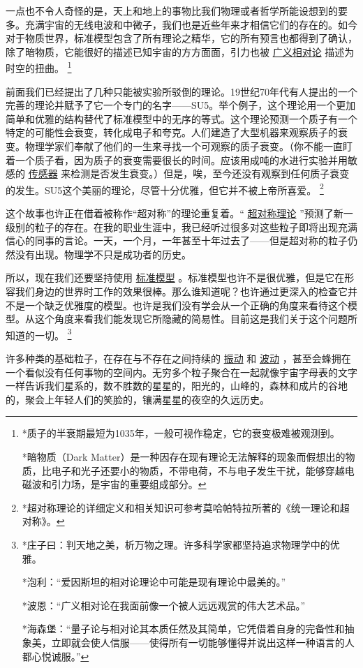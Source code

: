     一点也不令人奇怪的是，天上和地上的事物比我们物理或者哲学所能设想到的要多。充满宇宙的无线电波和中微子，我们也是近些年来才相信它们的存在的。如今对于物质世界，标准模型包含了所有理论之精华，它的所有预言也都得到了确认，除了暗物质，它能很好的描述已知宇宙的方方面面，引力也被
\href{http://toyhouse.cc/wiki/index.php/广义相对论}{广义相对论}
描述为时空的扭曲。
\footnote[5]
{ 
*质子的半衰期最短为1035年，一般可视作稳定，它的衰变极难被观测到。

*暗物质（Dark Matter）是一种因存在现有理论无法解释的现象而假想出的物质，比电子和光子还要小的物质，不带电荷，不与电子发生干扰，能够穿越电磁波和引力场，是宇宙的重要组成部分。
}

    前面我们已经提出了几种只能被实验所驳倒的理论。19世纪70年代有人提出的一个完善的理论并赋予了它一个专门的名字——SU5。举个例子，这个理论用一个更加简单和优雅的结构替代了标准模型中的无序的等式。这个理论预测一个质子有一个特定的可能性会衰变，转化成电子和夸克。人们建造了大型机器来观察质子的衰变。物理学家们奉献了他们的一生来寻找一个可观察的质子衰变。（你不能一直盯着一个质子看，因为质子的衰变需要很长的时间。应该用成吨的水进行实验并用敏感的
\href{http://toyhouse.cc/wiki/index.php/传感器}{传感器}
来检测是否发生衰变。）但是，唉，至今还没有观察到任何质子衰变的发生。SU5这个美丽的理论，尽管十分优雅，但它并不被上帝所喜爱。
\footnote[6]
{
*超对称理论的详细定义和相关知识可参考莫哈帕特拉所著的《统一理论和超对称》。
}

    这个故事也许正在借着被称作“超对称”的理论重复着。“
\href{http://toyhouse.cc/wiki/index.php/超对称理论}{超对称理论}
”预测了新一级别的粒子的存在。在我的职业生涯中，我已经听过很多对这些粒子即将出现充满信心的同事的言论。一天，一个月，一年甚至十年过去了——但是超对称的粒子仍然没有出现。物理学不只是成功者的历史。
 
    所以，现在我们还要坚持使用
\href{http://toyhouse.cc/wiki/index.php/标准模型}{标准模型}
。标准模型也许不是很优雅，但是它在形容我们身边的世界时工作的效果很棒。那么谁知道呢？也许通过更深入的检查它并不是一个缺乏优雅度的模型。也许是我们没有学会从一个正确的角度来看待这个模型。从这个角度来看我们能发现它所隐藏的简易性。目前这是我们关于这个问题所知道的一切。
\footnote[7]
{
*庄子曰：判天地之美，析万物之理。许多科学家都坚持追求物理学中的优雅。

*泡利：“爱因斯坦的相对论理论中可能是现有理论中最美的。”

*波恩：“广义相对论在我面前像一个被人远远观赏的伟大艺术品。”

*海森堡：“量子论与相对论其本质任然及其简单，它凭借着自身的完备性和抽象美，立即就会使人信服——使得所有一切能够懂得并说出这样一种语言的人都心悦诚服。”
}

    许多种类的基础粒子，在存在与不存在之间持续的
\href{http://toyhouse.cc/wiki/index.php/振动}{振动}
和
\href{http://toyhouse.cc/wiki/index.php/波动}{波动}
，甚至会蜂拥在一个看似没有任何事物的空间内。无穷多个粒子聚合在一起就像宇宙字母表的文字一样告诉我们星系的，数不胜数的星星的，阳光的，山峰的，森林和成片的谷地的，聚会上年轻人们的笑脸的，镶满星星的夜空的久远历史。


\noindent
